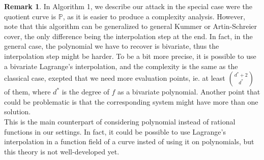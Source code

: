 \documentclass[10pt]{article}
\theoremstyle{definition}
\newtheorem{rq1}[thm]{Remark}
\theoremstyle{definition}
\theoremstyle{definition}
\newcommand{\s}{\vspace{0.3cm}}
\newcommand{\PP}{\mathbb{P}}
\begin{document}
\s

\begin{rq1}
In Algorithm 1, we describe our attack in the special case were the quotient curve is $\PP$, as it is easier to produce a complexity analysis. However, note that this algorithm can be generalized to general Kummer or Artin-Schreier cover, the only difference being the interpolation step at the end. In fact, in the general case, the polynomial we have to recover is bivariate, thus the interpolation step might be harder. To be a bit more precise, it is possible to use a bivariate Lagrange's interpolation, and the complexity is the same as the classical case, exepted that we need more evaluation points, ie. at least \color{purple} $\binom{d^*+2}{d^*}$ of them, where $d^*$ is the degree of $f$ as a bivariate polynomial.\color{black}  Another point that could be problematic is that the corresponding system might have more than one solution. \\
This is the main counterpart of considering polynomial instead of rational functions in our settings. In fact, it could be possible to use Lagrange's interpolation in a function field of a curve insted of using it on polynomials, but this theory is not well-developed yet.
\end{rq1}
\end{document}

